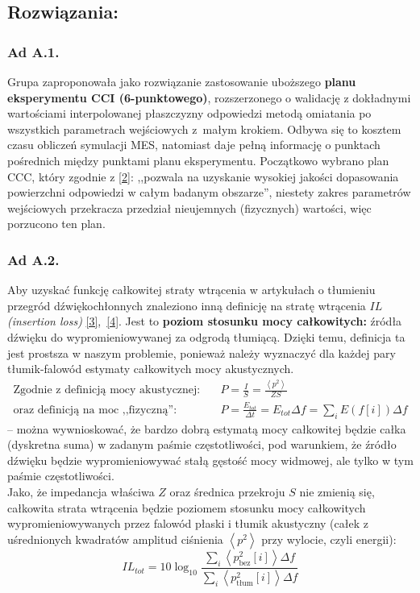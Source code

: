 \documentclass{sprawozdanie-agh}
\begin{document}
\subsection{Rozwiązania:}
\subsubsection{Ad A.1.}
Grupa zaproponowała jako rozwiązanie zastosowanie uboższego \textbf{planu eksperymentu CCI (6-punktowego)}, rozszerzonego o walidację z dokładnymi wartościami interpolowanej płaszczyzny odpowiedzi metodą omiatania po wszystkich parametrach wejściowych z~małym krokiem. Odbywa się to kosztem czasu obliczeń symulacji MES, natomiast daje pełną informację o punktach pośrednich między punktami planu eksperymentu. Początkowo wybrano plan CCC, który zgodnie z \hyperref[ref2]{[2]}: ,,pozwala na uzyskanie wysokiej jakości dopasowania powierzchni odpowiedzi w całym badanym obszarze'', niestety zakres parametrów wejściowych przekracza przedział nieujemnych (fizycznych) wartości, więc porzucono ten plan.
\subsubsection{Ad A.2.} Aby uzyskać funkcję całkowitej straty wtrącenia w artykułach o tłumieniu przegród dźwiękochłonnych znaleziono inną definicję na stratę wtrącenia $IL$ \textit{(insertion loss)} \hyperref[ref3]{[3]},~\hyperref[ref4]{[4]}. Jest to \textbf{poziom stosunku mocy całkowitych:} źródła dźwięku do wypromieniowywanej za odgrodą tłumiącą. Dzięki temu, definicja ta jest prostsza w naszym problemie, ponieważ należy wyznaczyć dla każdej pary tłumik-falowód estymaty całkowitych mocy akustycznych.
\begin{align*}
    \textrm{Zgodnie z definicją mocy akustycznej:}\quad&P=\tfrac{I}{S}=\tfrac{\left\langle p^2\right\rangle}{Z S}\\
    \textrm{oraz definicją na moc ,,fizyczną'':}\quad&P=\tfrac{E_{tot}}{\Delta t}=E_{tot}\Delta f=\textstyle\sum\nolimits_i E(f[i]) \Delta f
\end{align*}
-- można wywnioskować, że bardzo dobrą estymatą mocy całkowitej będzie całka (dyskretna suma) w zadanym paśmie częstotliwości, pod warunkiem, że źródło dźwięku będzie wypromieniowywać stałą gęstość mocy widmowej, ale tylko w tym paśmie częstotliwości.\\ Jako, że impedancja właściwa $Z$ oraz średnica przekroju $S$ nie zmienią się, całkowita strata wtrącenia będzie poziomem stosunku mocy całkowitych wypromieniowywanych przez falowód płaski i tłumik akustyczny (całek z uśrednionych kwadratów amplitud ciśnienia $\left\langle p^2\right\rangle$ przy wylocie, czyli energii):
\vspace{-0.7cm}
\begin{equation}
     \boxed{IL_{tot} = 10\log_{10}{\frac{\sum_i \left\langle p_{\textrm{bez}}^2[i] \right\rangle\Delta f}{\sum_i \left\langle p_{\textrm{tłum}}^2[i]\right\rangle \Delta f}}  }
     \label{eq}
\end{equation}
\end{document}
